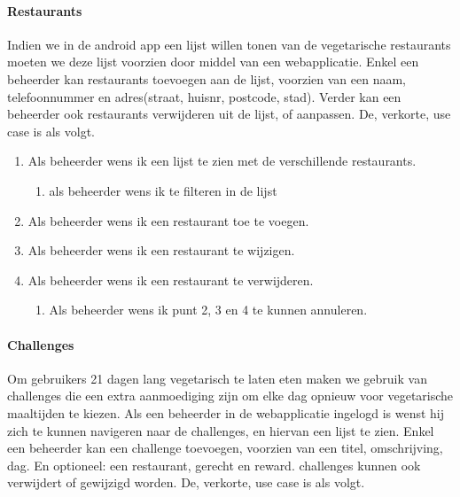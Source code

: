 \paragraph{Restaurants}

Indien we in de android app een lijst willen tonen van de vegetarische restaurants moeten we deze
lijst voorzien door middel van een webapplicatie. Enkel een beheerder kan restaurants toevoegen 
aan de lijst, voorzien van een naam, telefoonnummer en adres(straat, huisnr, postcode, stad). 
Verder kan een beheerder ook restaurants verwijderen uit de lijst, of aanpassen. 
De, verkorte, use case is als volgt.

\begin{enumerate}
	\item Als beheerder wens ik een lijst te zien met de verschillende restaurants.
	\begin{enumerate}
		\item als beheerder wens ik te filteren in de lijst
	\end{enumerate}
	\item Als beheerder wens ik een restaurant toe te voegen.
	\item Als beheerder wens ik een restaurant te wijzigen.
	\item Als beheerder wens ik een restaurant te verwijderen.
	\begin{enumerate}
		\item Als beheerder wens ik punt 2, 3 en 4 te kunnen annuleren.
	\end{enumerate}
\end{enumerate}

\paragraph{Challenges}

Om gebruikers 21 dagen lang vegetarisch te laten eten maken we gebruik van challenges die een
extra aanmoediging zijn om elke dag opnieuw voor vegetarische maaltijden te kiezen. Als een 
beheerder in de webapplicatie ingelogd is wenst hij zich te kunnen navigeren naar de 
challenges, en hiervan een lijst te zien. Enkel een beheerder kan een challenge toevoegen,
voorzien van een titel, omschrijving, dag. En optioneel: een restaurant, gerecht en reward.
challenges kunnen ook verwijdert of gewijzigd worden.
De, verkorte, use case is als volgt.


